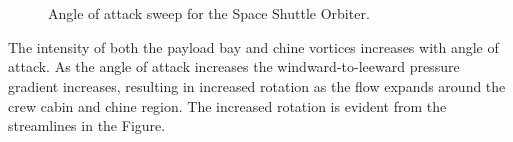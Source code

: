 \begin{figure}[hbtp]
  \begin{center}
     \\
     \\
    \caption{Angle of attack sweep for the Space Shuttle Orbiter.\label{fig:orbiter_alpha_sweep}}
  \end{center}
\end{figure}

The intensity of both the payload bay and chine vortices increases with angle of attack.  As the angle of attack increases the windward-to-leeward pressure gradient increases, resulting in increased rotation as the flow expands around the crew cabin and chine region.  The increased rotation is evident from the streamlines in the Figure.

